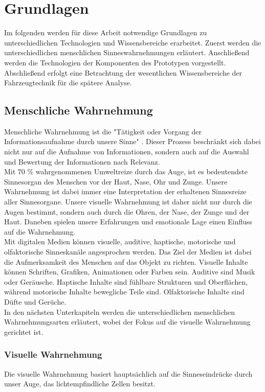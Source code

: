 \chapter{Grundlagen}
\label{cha:Grundlagen}
Im folgenden werden für diese Arbeit notwendige Grundlagen zu unterschiedlichen Technologien und Wissensbereiche erarbeitet. Zuerst werden die unterschiedlichen menschlichen Sinneswahrnehmungen erläutert. Anschließend werden die Technologien der Komponenten des Prototypen vorgestellt. Abschließend erfolgt eine Betrachtung der wesentlichen Wissensbereiche der Fahrzeugtechnik für die spätere Analyse.
\section{Menschliche Wahrnehmung}
Menschliche Wahrnehmung ist die "Tätigkeit oder Vorgang der Informationsaufnahme durch unsere Sinne" \cite[Seite 12]{Buhler.2017}. Dieser Prozess beschränkt sich dabei nicht nur auf die Aufnahme von Informationen, sondern auch auf die Auswahl und Bewertung der Informationen nach Relevanz. \cite[Vgl. Seite 12]{Buhler.2017}\\
Mit 70 \% wahrgenommenen Umweltreize durch das Auge, ist es bedeutendste Sinnesorgan des Menschen vor der Haut, Nase, Ohr und Zunge. Unsere Wahrnehmung ist dabei immer eine Interpretation der erhaltenen Sinnesreize aller Sinnesorgane. Unsere visuelle Wahrnehmung ist daher nicht nur durch die Augen bestimmt, sondern auch durch die Ohren, der Nase, der Zunge und der Haut. Daneben spielen unsere Erfahrungen und emotionale Lage einen Einfluss auf die Wahrnehmung. \cite[Vgl. Seite 13 f.]{Buhler.2017}\\
Mit digitalen Medien können visuelle, auditive, haptische, motorische und olfaktorische Sinneskanäle angesprochen werden. Das Ziel der Medien ist dabei die Aufmerksamkeit des Menschen auf das Objekt zu richten. Visuelle Inhalte können Schriften, Grafiken, Animationen oder Farben sein. Auditive sind Musik oder Geräusche. Haptische Inhalte sind fühlbare Strukturen und Oberflächen, während motorische Inhalte bewegliche Teile sind. Olfaktorische Inhalte sind Düfte und Gerüche. \cite[Vgl. Seite 3]{Buhler.2017}\\
In den nächsten Unterkapiteln werden die unterschiedlichen menschlichen Wahrnehmungsarten erläutert, wobei der Fokus auf die visuelle Wahrnehmung gerichtet ist.
\subsection{Visuelle Wahrnehmung}
Die visuelle Wahrnehmung basiert hauptsächlich auf die Sinneseindrücke durch unser Auge, das lichtempfindliche Zellen besitzt.

